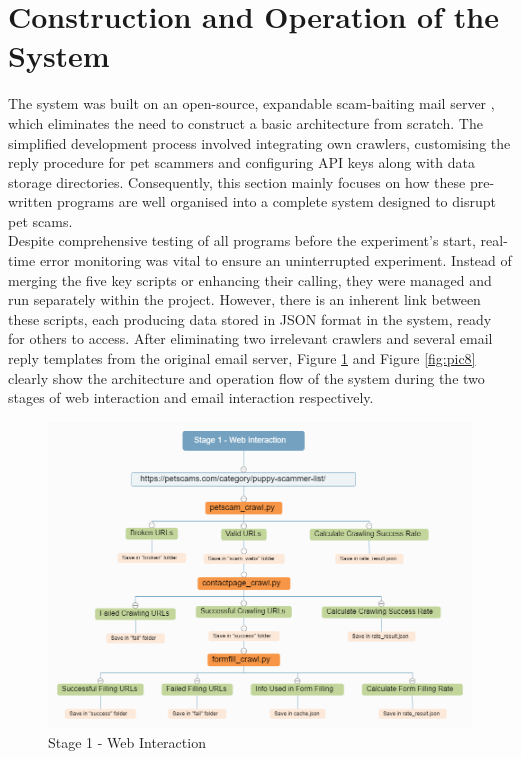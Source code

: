 \documentclass[ oneside,%
                    author={Cassie Qing Tang},
                    degree={BSc},
                     title={An Automated Response System for Disrupting Online Pet Scamming \\ },
                    subtitle={ }]{dissertation}
\begin{document}
\section{Construction and Operation of the System}
The system was built on an open-source, expandable scam-baiting mail server \cite{an19352_an19352scambaiter_back_2023}, which eliminates the need to construct a basic architecture from scratch. The simplified development process involved integrating own crawlers, customising the reply procedure for pet scammers and configuring API keys along with data storage directories. Consequently, this section mainly focuses on how these pre-written programs are well organised into a complete system designed to disrupt pet scams.
\\

Despite comprehensive testing of all programs before the experiment's start, real-time error monitoring was vital to ensure an uninterrupted experiment. Instead of merging the five key scripts or enhancing their calling, they were managed and run separately within the project. However, there is an inherent link between these scripts, each producing data stored in JSON format in the system, ready for others to access. After eliminating two irrelevant crawlers and several email reply templates from the original email server, Figure \ref{fig:pic7} and Figure \ref{fig:pic8} clearly show the architecture and operation flow of the system during the two stages of web interaction and email interaction respectively.
\begin{figure}[H]
\centering
\includegraphics[width=0.8\linewidth]{pic/figure7.png}
\caption{Stage 1 - Web Interaction}
\label{fig:pic7}
\end{figure}
\end{document}
